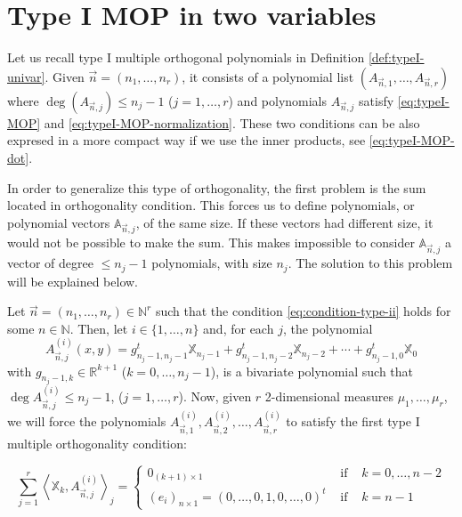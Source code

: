 \documentclass[12pt,a4]{article}
\theoremstyle{plain}
\newcommand{\R}[0]{\mathbb{R}}
\newcommand{\N}[0]{\mathbb{N}}
\newcommand{\prodesc}[2]{\left\langle #1 , #2 \right\rangle}
\begin{document}
\section{Type I MOP in two variables}

Let us recall type I multiple orthogonal polynomials in Definition \ref{def:typeI-univar}. Given $\vec n =(n_1,\dots,n_r)$, it consists of a polynomial list $(A_{\vec n,1},\dots,A_{\vec n, r})$ where $\deg(A_{\vec n,j})\leq n_j-1$ ($j=1,\dots,r$) and polynomials $A_{\vec n,j}$ satisfy \eqref{eq:typeI-MOP} and \eqref{eq:typeI-MOP-normalization}. These two conditions can be also expresed in a more compact way if we use the inner products, see \eqref{eq:typeI-MOP-dot}.

In order to generalize this type of orthogonality, the first problem is the sum located in orthogonality condition. This forces us to define polynomials, or polynomial vectors $\mathbb A_{\vec n, j}$, of the same size. If these vectors had different size, it would not be possible to make the sum. This makes impossible to consider $\mathbb A_{\vec n,j}$ a vector of degree $\leq n_j-1$ polynomials, with size $n_j$. The solution to this problem will be explained below.

Let $\vec n = (n_1,\dots,n_r)\in\N^r$ such that the condition \eqref{eq:condition-type-ii} holds for some $n\in\N$. Then, let $i\in\{1,\dots,n\}$ and, for each $j$, the polynomial $$A_{\vec n, j}^{(i)}(x,y) = g_{n_j-1,n_j-1}^t \mathbb X_{n_j-1} + g_{n_j-1,n_j-2}^t \mathbb X_{n_j-2} + \cdots + g_{n_j-1,0}^t \mathbb X_{0}$$ with $g_{n_j-1,k}\in\R^{k+1}$ ($k=0,\dots,n_j-1$), is a bivariate polynomial such that $\deg A_{\vec n, j}^{(i)} \leq n_j-1$, ($j=1,\dots,r$). Now, given $r$ 2-dimensional measures $\mu_1,\dots,\mu_r$, we will force the polynomials $A_{\vec n, 1}^{(i)}, A_{\vec n, 2}^{(i)}, \dots, A_{\vec n, r}^{(i)}$ to satisfy the first type I multiple orthogonality condition:

\begin{equation}
    \label{eq:first-condition-type-I}
    \sum_{j=1}^r \prodesc{\mathbb X_k}{A_{\vec n,j}^{(i)}}_j = \left\{\begin{array}{ccl}
        0_{(k+1)\times 1} &   \text{ if } & k=0,\dots,n-2 \\
        (e_i)_{n\times 1} = (0,\dots,0,1,0,\dots,0)^t & \text{ if } & k=n-1      
    \end{array}\right.
\end{equation}
\end{document}
